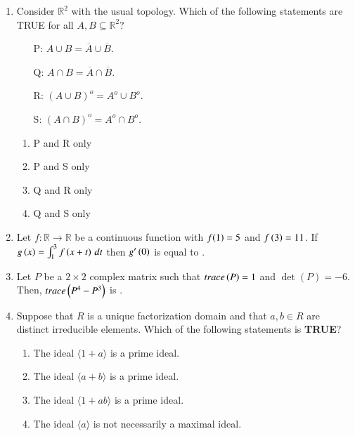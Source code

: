 \documentclass[journal]{IEEEtran}
\begin{document}
\begin{enumerate}
\item  Consider $ \mathbb{R}^{2} $ with the usual topology. Which of the following statements are TRUE for all $ A, B \subseteq \mathbb{R}^{2}$?
\begin{itemize}
    \item[P:]$ A \cup B = \overline{A} \cup \overline{B} $.
    \item[Q:]$ A \cap B = \overline{A} \cap \overline{B} $.
    \item[R:]$ (A \cup B)^o = A^o \cup B^o $.
    \item[S:]$ (A \cap B)^o = A^o \cap B^o $.
\end{itemize}
\begin{multicols}{4}
\begin{enumerate}
    \item P and R only
    \item P and S only
    \item Q and R only
    \item Q and S only
\end{enumerate}
\end{multicols}
\item Let $ f : \mathbb{R} \to \mathbb{R} $ be a continuous function with $ f{\left(1\right)} = 5 $ and $ f\left(3\right) = 11 $. If $ g\left(x\right) = \int_1^3 f\left(x + t\right) \, dt $ then $ g^{\prime}\left(0\right) $ is equal to \underline{\hspace{2cm}}.
\\
\item  Let  $P$  be a $ 2 \times 2 $ complex matrix such that $ trace\left(P\right) = 1 $ and $ \det(P) = -6 $. Then, $ trace\left(P^{4} - P^{3}\right) $ is \underline{\hspace{2cm}}.
\\
\item  Suppose that  $R$  is a unique factorization domain and that $ a, b \in R $ are distinct irreducible elements. Which of the following statements is \textbf{TRUE}?
\begin{enumerate}
    \item The ideal \( \langle 1 + a \rangle \) is a prime ideal.
    \item The ideal \( \langle a + b \rangle \) is a prime ideal.
    \item The ideal \( \langle 1 + ab \rangle \) is a prime ideal.
    \item The ideal \( \langle a \rangle \) is not necessarily a maximal ideal.
\end{enumerate}


\end{enumerate}
\end{document}
